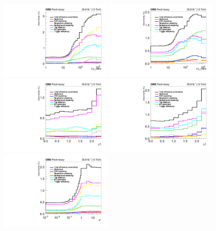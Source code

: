 \begin{figure}
	\centering
	\includegraphics[width=0.49\textwidth]{figures/zpt/histoUnfoldingSystEffPt_nsel0_dy3.pdf}
        \includegraphics[width=0.49\textwidth]{figures/zpt/histoUnfoldingSystEffPt_nsel1_dy3.pdf}
	\includegraphics[width=0.49\textwidth]{figures/zpt/histoUnfoldingSystEffRap_nsel0_dy3.pdf}
        \includegraphics[width=0.49\textwidth]{figures/zpt/histoUnfoldingSystEffRap_nsel1_dy3.pdf}
	\includegraphics[width=0.49\textwidth]{figures/zpt/histoUnfoldingSystEffPhiStar_nsel0_dy3.pdf}

\end{figure}
